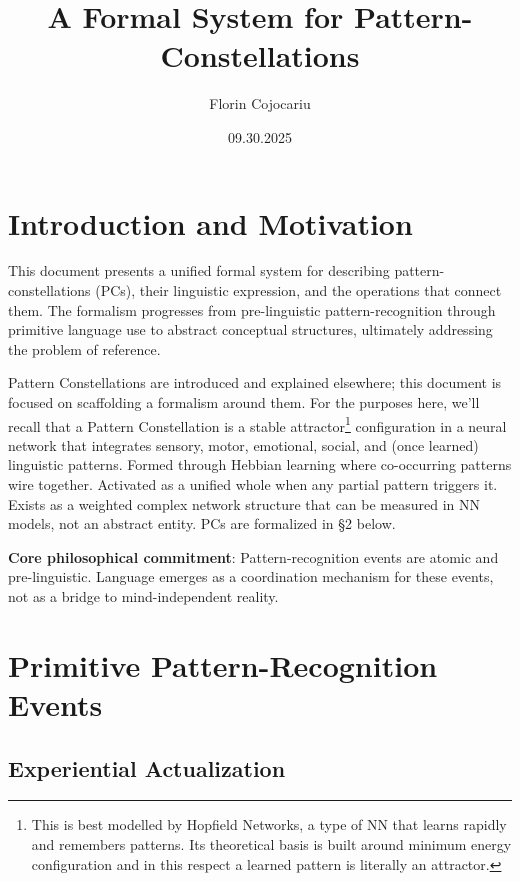 \documentclass[12pt]{article}
\title{A Formal System for Pattern-Constellations}
\author{Florin Cojocariu}
\date{09.30.2025}
\begin{document}
\maketitle
\clearpage
\tableofcontents
\setcounter{tocdepth}{3}
\clearpage
\section{Introduction and Motivation}\label{introduction-and-motivation}

This document presents a unified formal system for describing pattern-constellations (PCs), their linguistic expression, and the operations that connect them. The formalism progresses from pre-linguistic pattern-recognition through primitive language use to abstract conceptual structures, ultimately addressing the problem of reference.

Pattern Constellations are introduced and explained elsewhere; this document is focused on scaffolding a formalism around them. For the purposes here, we'll recall that a Pattern Constellation is a stable attractor\footnote{This is best modelled by Hopfield Networks, a type of NN that learns rapidly and remembers patterns. Its theoretical basis is built around minimum energy configuration and in this respect a learned pattern is literally an attractor.} configuration in a neural network that integrates sensory, motor, emotional, social, and (once learned) linguistic patterns. Formed through Hebbian learning where co-occurring patterns wire together. Activated as a unified whole when any partial pattern triggers it. Exists as a weighted complex network structure that can be measured in NN models, not an abstract entity. PCs are formalized in §2 below.

\textbf{Core philosophical commitment}: Pattern-recognition events are atomic and pre-linguistic. Language emerges as a coordination mechanism for these events, not as a bridge to mind-independent reality.

\section{Primitive Pattern-Recognition Events}\label{primitive-pattern-recognition-events}

\subsection{Experiential Actualization}\label{experiential-actualization}
\end{document}
